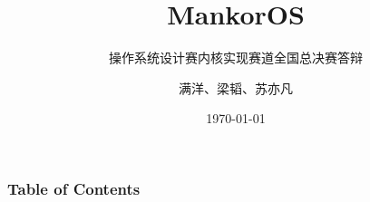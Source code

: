 \documentclass[aspectratio=169]{beamer}
\title{MankorOS}
\subtitle{操作系统设计赛内核实现赛道全国总决赛答辩}
\author{满洋、梁韬、苏亦凡}
\institute[HITSZ]{哈尔滨工业大学（深圳）}
\date{\today}
\begin{document}
\frame{\titlepage}

\begin{frame}
    \frametitle{Table of Contents}
    \tableofcontents
\end{frame}










\end{document}
